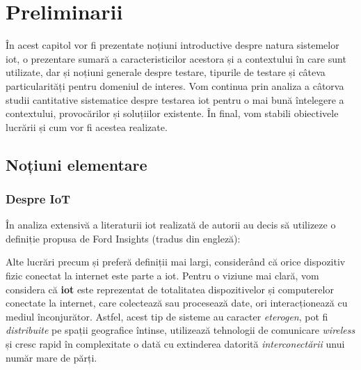 \chapter{Preliminarii}

În acest capitol vor fi prezentate noțiuni introductive despre natura sistemelor \acrfull{iot}, o prezentare sumară a caracteristicilor acestora și a contextului în care sunt utilizate, dar și noțiuni generale despre testare, tipurile de testare și câteva particularități pentru domeniul de interes. Vom continua prin analiza a câtorva studii cantitative sistematice despre testarea \acrshort{iot} pentru o mai bună întelegere a contextului, provocărilor și soluțiilor existente. În final, vom stabili obiectivele lucrării și cum vor fi acestea realizate.

\section{Noțiuni elementare}

\subsection{Despre IoT}


În analiza extensivă a literaturii \acrshort{iot} realizată de \citet{Nord2019} autorii au decis să utilizeze o definiție propusa de Ford Insights \citet{insight2017internet} (tradus din engleză):



Alte lucrări precum \citet{Lee2015} și \citet{Huang2015} preferă definiții mai largi, considerând că orice dispozitiv fizic conectat la internet este parte a \acrshort{iot}. Pentru o viziune mai clară, vom considera că \textbf{\acrshort{iot}} este reprezentat de totalitatea dispozitivelor și computerelor conectate la internet, care colectează sau procesează date, ori interacționează cu mediul înconjurător. Astfel, acest tip de sisteme au caracter \emph{eterogen}, pot fi \emph{distribuite} pe spații geografice întinse, utilizează tehnologii de comunicare \emph{wireless} și cresc rapid în complexitate o dată cu extinderea datorită \emph{interconectării} unui număr mare de părți.

